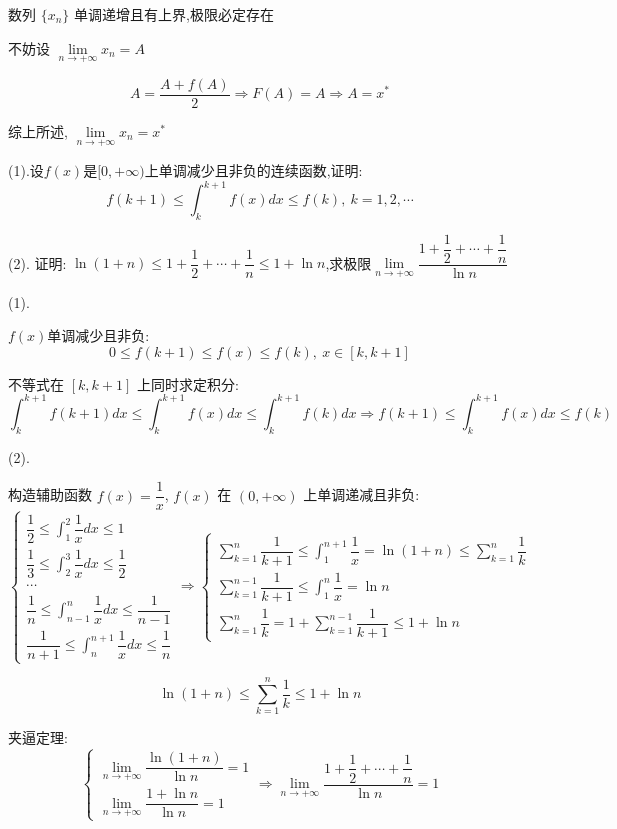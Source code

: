 \begin{solution}
	数列 $\{x_{n}\}$ 单调递增且有上界,极限必定存在
	
	不妨设 $\lim\limits_{n\to +\infty}x_{n} = A$
	
	$$A=\dfrac{A+f(A)}{2}\Rightarrow F(A)=A\Rightarrow A=x^{*}$$
	
	综上所述, $\lim\limits_{n\rightarrow+\infty}x_{n}=x^{*}$
\end{solution}
\begin{proposition}
(1).设$f(x)$是$[0,+\infty)$上单调减少且非负的连续函数,证明:  $$f(k+1)\leq \int_{k}^{k+1}f(x)dx\leq f(k),\ k=1,2,\cdots$$

(2). 证明:  $\ln(1+n)\leq 1+\dfrac{1}{2}+\cdots+\dfrac{1}{n}\leq 1+\ln n$,求极限$\lim\limits_{n\rightarrow+\infty}\dfrac{1+\dfrac{1}{2}+\cdots+\dfrac{1}{n}}{\ln n}$

\end{proposition}
\begin{solution}
	
	(1). 
	
	$f(x)$单调减少且非负:  
	$$0\leq f(k+1)\leq f(x)\leq f(k),\ x\in[k,k+1]$$
	
	不等式在 $[k,k+1]$ 上同时求定积分:  
	$$\int_{k}^{k+1}f(k+1)dx\leq \int_{k}^{k+1}f(x)dx\leq \int_{k}^{k+1}f(k)dx\Rightarrow f(k+1)\leq \int_{k}^{k+1}f(x)dx\leq f(k)$$
	
	(2). 
	
	构造辅助函数 $f(x)=\dfrac{1}{x}$, $f(x)$ 在 $(0,+\infty)$ 上单调递减且非负:  
	$$\begin{cases}
		\displaystyle{\dfrac{1}{2}\leq \int_{1}^{2}\dfrac{1}{x}dx\leq 1} \\
		\displaystyle{\dfrac{1}{3}\leq \int_{2}^{3}\dfrac{1}{x}dx\leq \dfrac{1}{2}} \\
		\cdots\\
		\displaystyle{\dfrac{1}{n}\leq \int_{n-1}^{n}\dfrac{1}{x}dx\leq \dfrac{1}{n-1}}\\
		\displaystyle{\dfrac{1}{n+1}\leq \int_{n}^{n+1}\dfrac{1}{x}dx\leq \dfrac{1}{n}}
	\end{cases} \Rightarrow
	\begin{cases}
		\displaystyle{\sum\limits_{k=1}^{n}\dfrac{1}{k+1}\leq \int_{1}^{n+1}\dfrac{1}{x}=\ln(1+n)\leq \sum\limits_{k=1}^{n}\dfrac{1}{k}}\\
		\displaystyle{\sum\limits_{k=1}^{n-1}\dfrac{1}{k+1}\leq \int_{1}^{n}\dfrac{1}{x}=\ln n}\\
		\displaystyle{\sum\limits_{k=1}^{n}\dfrac{1}{k}=1+\sum\limits_{k=1}^{n-1}\dfrac{1}{k+1}\leq 1+\ln n}
	\end{cases}$$
	
	$$\ln(1+n)\leq \sum\limits_{k=1}^{n}\dfrac{1}{k}\leq 1+\ln n$$

	夹逼定理:  
	$$\begin{cases}
		\lim\limits_{n\rightarrow +\infty}\dfrac{\ln(1+n)}{\ln n} = 1\\
		\lim\limits_{n\rightarrow +\infty}\dfrac{1+\ln n}{\ln n} = 1
	\end{cases}\Rightarrow 
	\lim\limits_{n\rightarrow +\infty}\dfrac{1+\dfrac{1}{2}+\cdots+\dfrac{1}{n}}{\ln n}=1$$
\end{solution}

